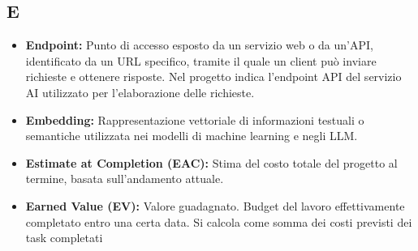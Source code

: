 {}
\subsection*{E}
\begin{itemize}[leftmargin=*]
      \item \textbf{Endpoint:} Punto di accesso esposto da un servizio web o da un'API, identificato da un URL specifico, tramite il quale un client può inviare richieste e ottenere risposte. Nel progetto indica l'endpoint API del servizio AI utilizzato per l'elaborazione delle richieste.
      \item \textbf{Embedding:} Rappresentazione vettoriale di informazioni testuali o semantiche utilizzata nei modelli di machine learning e negli LLM.
      \item \textbf{Estimate at Completion (EAC):} Stima del costo totale del 
      progetto al termine, basata sull'andamento attuale.
      \item \textbf{Earned Value (EV):} Valore guadagnato. 
      Budget del lavoro effettivamente completato entro una certa data. 
      Si calcola come somma dei costi previsti dei task completati
\end{itemize}
 
{}
